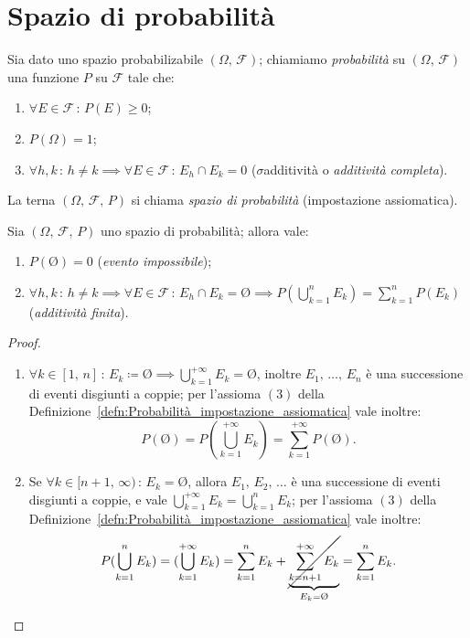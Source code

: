     \section{Spazio di probabilità}
        \begin{defn}\label{defn:Probabilità_impostazione_assiomatica}
            Sia dato uno spazio probabilizabile $(\Omega,\,\mathscr{F})$; chiamiamo \emph{probabilità} su $(\Omega,\,\mathscr{F})$ una funzione $P$ su $\mathscr{F}$ tale che:
            \begin{enumerate}
                \item $\forall E \in \mathscr{F}\,:\,P(E) \geq 0$;
                \item $P(\Omega) = 1$;
                \item $\forall h,k\,:\,h \neq k \implies \forall E \in \mathscr{F}\,:\,E_h \cap E_k = 0$ ($\sigma$\nbdash additività o \emph{additività completa}).
            \end{enumerate}
            La terna $(\Omega,\,\mathscr{F},\,P)$ si chiama \emph{spazio di probabilità} (impostazione assiomatica).
        \end{defn}
        \begin{prty}\label{prty:Spazio_di_probabilità}
            Sia $(\Omega,\,\mathscr{F},\,P)$ uno spazio di probabilità; allora vale:
            \begin{enumerate}
                \item $P(\text{\O}) = 0$ (\emph{evento impossibile});
                \item $\forall h,k\,:\,h \neq k \implies \forall E \in \mathscr{F}\,:\,E_h \cap E_k = \text{\O} \implies P(\bigcup_{k=1}^{n} E_k) = \sum_{k=1}^{n} P(E_k)$ (\emph{additività finita}).
            \end{enumerate}
        \end{prty}
        \begin{proof}
            \hfill
            \begin{enumerate}
                \item $\forall k \in [1,\,n]\,:\,E_k \coloneqq \text{\O} \implies \bigcup_{k=1}^{+\infty} E_k = \text{\O}$, inoltre $E_1,\,\ldots,\,E_n$ è una successione di eventi disgiunti a coppie; per l'assioma $(3)$ della Definizione~\ref{defn:Probabilità_impostazione_assiomatica} vale inoltre: \[
                        P\left(\text{\O}\right) = P\left(\bigcup_{k=1}^{+\infty} E_k\right) = \sum_{k=1}^{+\infty} P\left(\text{\O}\right)
                .\] 
            \item Se $\forall k \in [n+1,\,\infty)\,:\,E_k = \text{\O}$, allora $E_1,\,E_2,\,\ldots$ è una successione di eventi disgiunti a coppie, e vale $\bigcup_{k=1}^{+\infty} E_k = \bigcup_{k=1}^{n} E_k$; per l'assioma $(3)$ della Definizione~\ref{defn:Probabilità_impostazione_assiomatica} vale inoltre: \[
                    P(\bigcup_{k=1}^{n} E_k) = (\bigcup_{k=1}^{+\infty} E_k) = \sum_{k=1}^{n} E_k + \underset{E_k = \text{\O}}{\underbrace{\cancel{\sum_{k=n+1}^{+\infty} E_k}}} = \sum_{k=1}^{n} E_k
            . \qedhere\]
            \end{enumerate}
        \end{proof}
